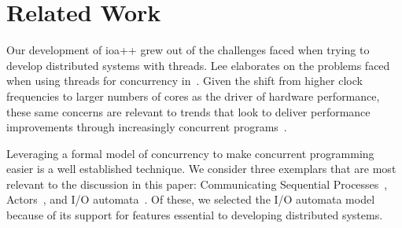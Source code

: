 \section{Related Work\label{related_work}}

Our development of ioa++ grew out of the challenges faced when trying to develop distributed systems with threads.
Lee elaborates on the problems faced when using threads for concurrency in~\cite{lee2006problem}.
Given the shift from higher clock frequencies to larger numbers of cores as the driver of hardware performance, these same concerns are relevant to trends that look to deliver performance improvements through increasingly concurrent programs~\cite{sutter2005software}.

Leveraging a formal model of concurrency to make concurrent programming easier is a well established technique.
We consider three exemplars that are most relevant to the discussion in this paper: Communicating Sequential Processes~\cite{hoare1978communicating}, Actors~\cite{agha1986actors}, and I/O automata~\cite{lynch1996distributed}.
Of these, we selected the I/O automata model because of its support for features essential to developing distributed systems.




